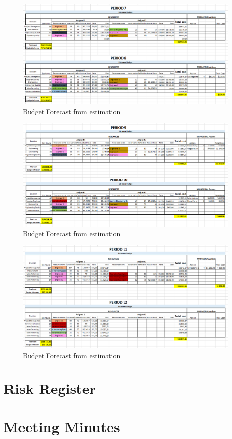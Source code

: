 \begin{appendices}
\begin{landscape}
\begin{figure}[H]
\includegraphics[scale=0.8]{budget_forecast_est_78.PNG}
\caption{Budget Forecast from estimation}
\end{figure}
\begin{figure}[H]
\includegraphics[scale=0.8]{budget_forecast_est_910.PNG}
\caption{Budget Forecast from estimation}
\end{figure}
\begin{figure}[H]
\includegraphics[scale=0.8]{budget_forecast_est_1112.PNG}
\caption{Budget Forecast from estimation}
\end{figure}

\end{landscape}

\section{Risk Register}
\section{Meeting Minutes}

\end{appendices}



